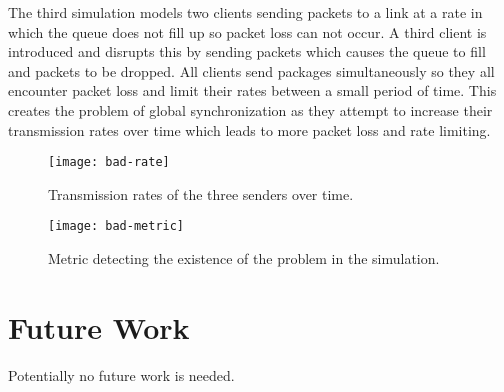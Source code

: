 \documentclass{article}
\begin{document}
	The third simulation models two clients sending packets to a link at a rate in which the queue does not fill up so packet loss can not occur. A third client is introduced and disrupts this by sending packets which causes the queue to fill and packets to be dropped. All clients send packages simultaneously so they all encounter packet loss and limit their rates between a small period of time. This creates the problem of global synchronization as they attempt to increase their transmission rates over time which leads to more packet loss and rate limiting.\newline
	\begin{figure}[H]
		\centering
		\texttt{[image: bad-rate]}
		\caption{Transmission rates of the three senders over time.}
	\end{figure}

	\begin{figure}[H]
		\centering
		\texttt{[image: bad-metric]}
		\caption{Metric detecting the existence of the problem in the simulation.}
	\end{figure}

\section{Future Work}
Potentially no future work is needed.



\end{document}
